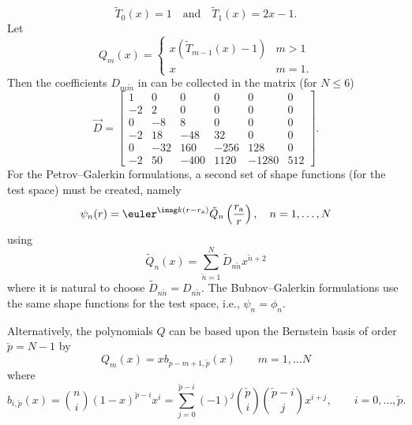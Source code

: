 \begin{equation}
	\tilde{T}_0(x) = 1\quad\text{and}\quad\tilde{T}_1(x) = 2x-1.
\end{equation}
Let
\begin{equation}
	Q_m(x) = \begin{cases}x\left(\tilde{T}_{m-1}(x)-1\right)& m>1\\
				x & m=1.
				\end{cases}
\end{equation}
Then the coefficients $D_{m\tilde{m}}$ in  can be collected in the matrix (for $N \leq 6$)
\begin{equation*}
	\vec{D} = \begin{bmatrix}
		1 & 0 & 0 & 0 & 0 & 0\\
		-2 & 2 & 0 & 0 & 0 & 0\\	
		0 & -8 & 8 & 0 & 0 & 0\\
		-2 & 18 & -48 & 32 & 0 & 0\\
		0 & -32 & 160 & -256 & 128 & 0\\
		-2 & 50 & -400 & 1120 & -1280 & 512
	\end{bmatrix}.
\end{equation*}
For the Petrov--Galerkin formulations, a second set of shape functions (for the test space) must be created, namely
\begin{equation}
	\psi_n(r) = \euler^{\imag k (r-r_{\mathrm{a}})}\tilde{Q}_n\left(\frac{r_{\mathrm{a}}}{r}\right),\quad n = 1,\dots,N
\end{equation}
using
\begin{equation}
	\tilde{Q}_n(x) = \sum_{\tilde{n}=1}^N \tilde{D}_{n\tilde{n}} x^{\tilde{n}+2}
\end{equation}
where it is natural to choose $\tilde{D}_{n\tilde{n}}=D_{n\tilde{n}}$. The Bubnov--Galerkin formulations use the same shape functions for the test space, i.e., $\psi_n = \phi_n$.

Alternatively, the polynomials $Q$ can be based upon the Bernstein basis of order $\check{p}=N-1$ by
\begin{equation}
	Q_m(x) = xb_{p-m+1,\check{p}}(x)\qquad m=1,\dots N
\end{equation}
where
\begin{equation}
	b_{i,\check{p}}(x) = \binom{n}{i}(1-x)^{\check{p}-i}x^i = \sum_{j=0}^{\check{p}-i}(-1)^j\binom{\check{p}}{i}\binom{\check{p}-i}{j} x^{i+j},\qquad i=0,\dots,\check{p}.
\end{equation}

